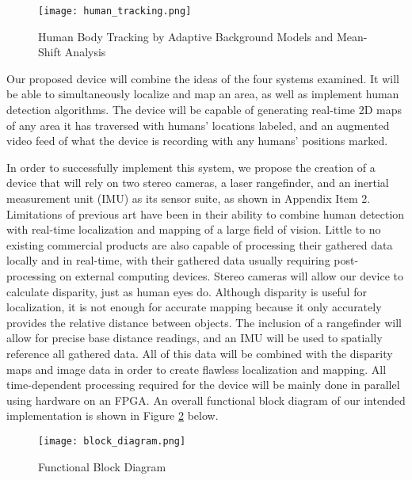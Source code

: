 \begin{figure}[H]
	\centerline{\texttt{[image: human\_tracking.png]}}
	\caption{Human Body Tracking by Adaptive Background Models and Mean-Shift Analysis \cite{porikli}}
	\label{human_tracking}
\end{figure}

Our proposed device will combine the ideas of the four systems examined. It will be able to simultaneously localize and map an area, as well as implement human detection algorithms. The device will be capable of generating real-time 2D maps of any area it has traversed with humans' locations labeled, and an augmented video feed of what the device is recording with any humans' positions marked.
\par
In order to successfully implement this system, we propose the creation of a device that will rely on two stereo cameras, a laser rangefinder, and an inertial measurement unit (IMU) as its sensor suite, as shown in Appendix Item 2. Limitations of previous art have been in their ability to combine human detection with real-time localization and mapping of a large field of vision. Little to no existing commercial products are also capable of processing their gathered data locally and in real-time, with their gathered data usually requiring post-processing on external computing devices. Stereo cameras will allow our device to calculate disparity, just as human eyes do. Although disparity is useful for localization, it is not enough for accurate mapping because it only accurately provides the relative distance between objects. The inclusion of a rangefinder will allow for precise base distance readings, and an IMU will be used to spatially reference all gathered data. All of this data will be combined with the disparity maps and image data in order to create flawless localization and mapping. All time-dependent processing required for the device will be mainly done in parallel using hardware on an FPGA. An overall functional block diagram of our intended implementation is shown in Figure \ref{orig_bd} below.

\begin{figure}[H]
	\centerline{\texttt{[image: block\_diagram.png]}}
	\caption{Functional Block Diagram}
	\label{orig_bd}
\end{figure}

